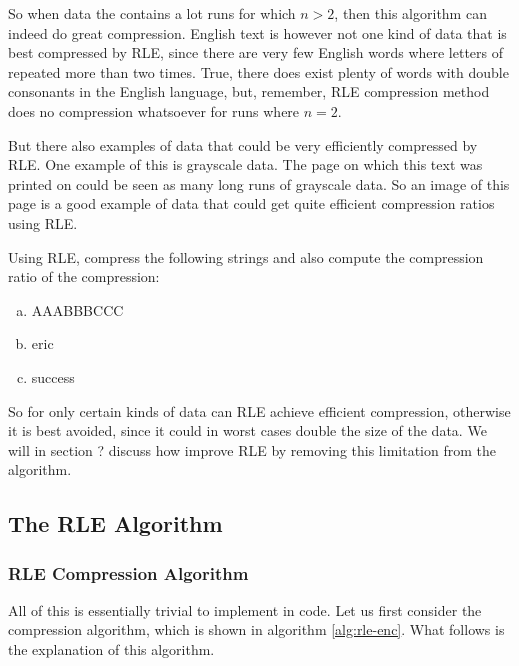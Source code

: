 So when data the contains a lot runs for which $n > 2$, then this
algorithm can indeed do great compression. English text is however not
one kind of data that is best compressed by RLE, since there are very
few English words where letters of repeated more than two times. True,
there does exist plenty of words with double consonants in the English
language, but, remember, RLE compression method does no compression
whatsoever for runs where $n=2$.

But there also examples of data that could be very efficiently
compressed by RLE. One example of this is grayscale data. The page on
which this text was printed on could be seen as many long runs of
grayscale data. So an image of this page is a good example of data
that could get quite efficient compression ratios using RLE.

\begin{Exercise}[label={rle-compression}]
  Using RLE, compress the following strings and also compute the
  compression ratio of the compression:

  \begin{enumerate}[(a)]
  \item AAABBBCCC
  \item eric
  \item success
  \end{enumerate}

\end{Exercise}

So for only certain kinds of data can RLE achieve efficient
compression, otherwise it is best avoided, since it could in worst
cases double the size of the data. We will in section ? discuss how
improve RLE by removing this limitation from the algorithm.

\subsection{The RLE Algorithm}

\subsubsection{RLE Compression Algorithm}

All of this is essentially trivial to implement in code. Let us first
consider the compression algorithm, which is shown in algorithm
\ref{alg:rle-enc}. What follows is the explanation of this algorithm.

